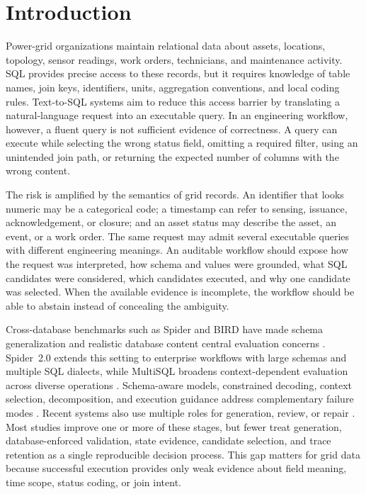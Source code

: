 \documentclass[applsci,article,submit,moreauthors]{Definitions/mdpi}
\begin{document}
\section{Introduction}

Power-grid organizations maintain relational data about assets, locations, topology, sensor readings, work orders, technicians, and maintenance activity. SQL provides precise access to these records, but it requires knowledge of table names, join keys, identifiers, units, aggregation conventions, and local coding rules. Text-to-SQL systems aim to reduce this access barrier by translating a natural-language request into an executable query. In an engineering workflow, however, a fluent query is not sufficient evidence of correctness. A query can execute while selecting the wrong status field, omitting a required filter, using an unintended join path, or returning the expected number of columns with the wrong content.

The risk is amplified by the semantics of grid records. An identifier that looks numeric may be a categorical code; a timestamp can refer to sensing, issuance, acknowledgement, or closure; and an asset status may describe the asset, an event, or a work order. The same request may admit several executable queries with different engineering meanings. An auditable workflow should expose how the request was interpreted, how schema and values were grounded, what SQL candidates were considered, which candidates executed, and why one candidate was selected. When the available evidence is incomplete, the workflow should be able to abstain instead of concealing the ambiguity.

Cross-database benchmarks such as Spider and BIRD have made schema generalization and realistic database content central evaluation concerns \cite{yu2018spider,li2023bird}. Spider~2.0 extends this setting to enterprise workflows with large schemas and multiple SQL dialects, while MultiSQL broadens context-dependent evaluation across diverse operations \cite{lei2025spider2,li2024multisql}. Schema-aware models, constrained decoding, context selection, decomposition, and execution guidance address complementary failure modes \cite{wang2020ratsql,scholak2021picard,nan2023enhancing,pourreza2023dinsql,talaei2024chess}. Recent systems also use multiple roles for generation, review, or repair \cite{lee2025team,wang2025macsql,shao2025qcmasql,xia2025r3}. Most studies improve one or more of these stages, but fewer treat generation, database-enforced validation, state evidence, candidate selection, and trace retention as a single reproducible decision process. This gap matters for grid data because successful execution provides only weak evidence about field meaning, time scope, status coding, or join intent.
\end{document}
